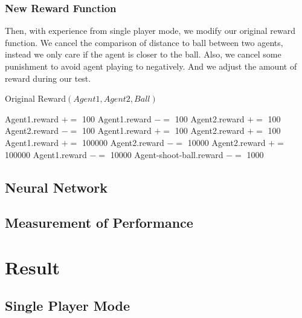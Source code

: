 \documentclass[12pt]{article}
\begin{document}
\subsubsection{New Reward Function}
Then, with experience from single player mode, we modify our original reward function. We cancel the comparison of distance to ball between two agents, instead we only care if the agent is closer to the ball. Also, we cancel some punishment to avoid agent playing to negatively. And we adjust the amount of reward during our test.
\begin{algorithm}[!h]
	\caption{Original Reward$(Agent1,Agent2,Ball)$}
	\begin{algorithmic}
		\State Agent1.reward $+=$ 100
		\Else
		\State Agent1.reward $-=$ 100
		\EndIf
		\State Agent2.reward $+=$ 100
		\Else
		\State Agent2.reward $-=$ 100
		\EndIf
		\State Agent1.reward $+=$ 100
		\EndIf
		\State Agent2.reward $+=$ 100
		\EndIf
		\State Agent1.reward $+=$ 100000
		\State Agent2.reward $-=$ 10000
		\EndIf
		\State Agent2.reward $+=$ 100000
		\State Agent1.reward $-=$ 10000
		\EndIf
		\State Agent-shoot-ball.reward $-=$ 1000
		\EndIf
	\end{algorithmic}
\end{algorithm}

\subsection{Neural Network}

\subsection{Measurement of Performance}



\section{Result}

\subsection{Single Player Mode}
\end{document}
